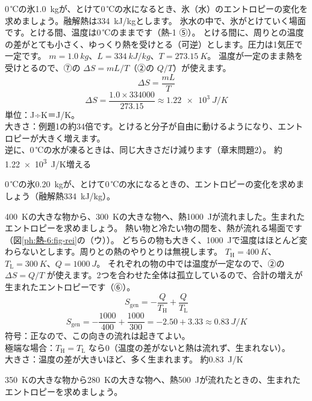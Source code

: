 \label{ph:熱-6:ex2}
\begin{phreidai}[氷がとけるときのエントロピー]
0\,℃の氷\qty{1.0}{kg}が、とけて0\,℃の水になるとき、氷（水）のエントロピーの変化を求めましょう。融解熱は\qty{334}{kJ/kg}とします。
\phbamen
氷水の中で、氷がとけていく場面です。とける間、温度は0\,℃のままです（熱-1 ⑤）。
\phmushi
とける間に、周りとの温度の差がとても小さく、ゆっくり熱を受けとる（可逆）とします。圧力は1気圧で一定です。
\phzu
$m=\qty{1.0}{kg}$、$L=\qty{334}{kJ/kg}$、$T=\qty{273.15}{K}$。
\phriyu
温度が一定のまま熱を受けとるので、⑦の $\Delta S=mL/T$（②の $Q/T$）が使えます。
\phtateru
\[\Delta S=\frac{mL}{T}\]
\phtoku
\[\Delta S=\frac{1.0\times334000}{273.15}\approx\qty{1.22e3}{J/K}\]
\phtashikame
単位：J÷K＝J/K。\\
大きさ：例題1の約34倍です。とけると分子が自由に動けるようになり、エントロピーが大きく増えます。\\
逆に、0\,℃の水が凍るときは、同じ大きさだけ減ります（章末問題2）。
\kotae 約\qty{1.22e3}{J/K}増える
\end{phreidai}
\begin{jibun}
0\,℃の氷\qty{0.20}{kg}が、とけて0\,℃の水になるときの、エントロピーの変化を求めましょう（融解熱\qty{334}{kJ/kg}）。
\end{jibun}

\label{ph:熱-6:ex3}
\begin{phreidai}[熱が流れて生まれるエントロピー]
\qty{400}{K}の大きな物から、\qty{300}{K}の大きな物へ、熱\qty{1000}{J}が流れました。生まれたエントロピーを求めましょう。
\phbamen
熱い物と冷たい物の間を、熱が流れる場面です（図\ref{ph:熱-6:fig-rei}の（ウ））。
\phmushi
どちらの物も大きく、\qty{1000}{J}で温度はほとんど変わらないとします。周りとの熱のやりとりは無視します。
\phzu
$T_{\mathrm H}=\qty{400}{K}$、$T_{\mathrm L}=\qty{300}{K}$、$Q=\qty{1000}{J}$。
\phriyu
それぞれの物の中では温度が一定なので、②の $\Delta S=Q/T$ が使えます。2つを合わせた全体は孤立しているので、合計の増えが生まれたエントロピーです（⑥）。
\phtateru
\[S_{\mathrm{gen}}=-\frac{Q}{T_{\mathrm H}}+\frac{Q}{T_{\mathrm L}}\]
\phtoku
\[S_{\mathrm{gen}}=-\frac{1000}{400}+\frac{1000}{300}=-2.50+3.33\approx\qty{0.83}{J/K}\]
\phtashikame
符号：正なので、この向きの流れは起きてよい。\\
極端な場合：$T_{\mathrm H}=T_{\mathrm L}$ なら0（温度の差がないと熱は流れず、生まれない）。\\
大きさ：温度の差が大きいほど、多く生まれます。
\kotae 約\qty{0.83}{J/K}
\end{phreidai}
\begin{jibun}
\qty{350}{K}の大きな物から\qty{280}{K}の大きな物へ、熱\qty{500}{J}が流れたときの、生まれたエントロピーを求めましょう。
\end{jibun}

